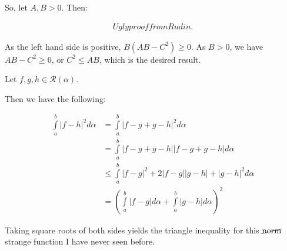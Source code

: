 \documentclass[a4paper,12pt]{article}
\newcommand{\tab}{\hspace{4mm}} %
\newcommand{\shunt}{\vspace{20mm}}
\newcommand{\absval}[1]{\left\lvert #1 \right\rvert}
\newcommand{\al}{\alpha} %
\newcommand{\scrR}{\mathcal{R}}
\begin{document}
\tab So, let $A, B >0$. Then:

\begin{align*}
Ugly proof from Rudin.
\end{align*}

\tab As the left hand side is positive, $B(AB-C^2) \geq 0$. As $B >0$, we have $AB - C^2 \geq 0$, or $C^2 \leq AB$, which is the desired result.

Let $f,g,h \in \scrR(\al)$.

Then we have the following:

\begin{align*}
\int\limits_a^b \absval{f-h}^2 d\al &= \int\limits_a^b \absval{f-g+g-h}^2 d\al \\
&= \int\limits_a^b \absval{f-g+g-h}\absval{f-g+g-h} d\al \\
&\leq \int\limits_a^b \absval{f-g}^2 +2\absval{f-g}\absval{g-h} + \absval{g-h}^2 d\al \\
&= \left(\int\limits_a^b \absval{f-g} d\al + \int\limits_a^b \absval{g-h} d\al\right)^2
\end{align*}

Taking square roots of both sides yields the triangle inequality for this $\cancel{\text{norm}}$ strange function I have never seen before.

\shunt
\end{document}
